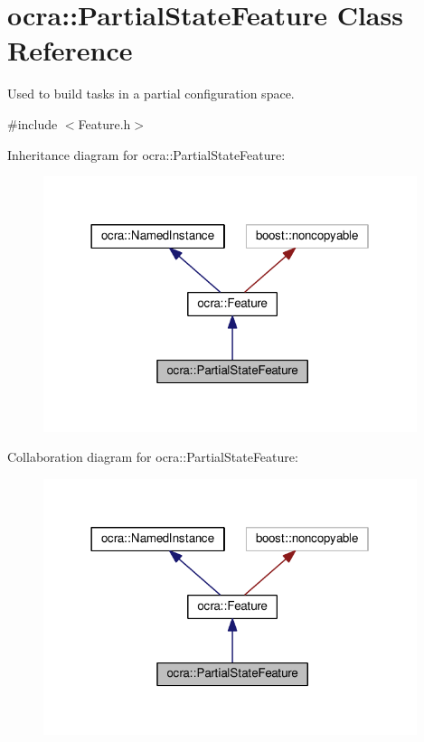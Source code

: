 \hypertarget{classocra_1_1PartialStateFeature}{}\section{ocra\+:\+:Partial\+State\+Feature Class Reference}
\label{classocra_1_1PartialStateFeature}


Used to build tasks in a partial configuration space.  




{\ttfamily \#include $<$Feature.\+h$>$}



Inheritance diagram for ocra\+:\+:Partial\+State\+Feature\+:
\nopagebreak
\begin{figure}[H]
\begin{center}
\leavevmode
\includegraphics[width=310pt]{d2/d88/classocra_1_1PartialStateFeature__inherit__graph}
\end{center}
\end{figure}


Collaboration diagram for ocra\+:\+:Partial\+State\+Feature\+:
\nopagebreak
\begin{figure}[H]
\begin{center}
\leavevmode
\includegraphics[width=310pt]{d0/d24/classocra_1_1PartialStateFeature__coll__graph}
\end{center}
\end{figure}
